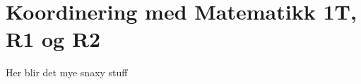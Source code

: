 \section*{Koordinering med Matematikk 1T, R1 og R2} \label{Sec: KoordR1R2}

	Her blir det mye snaxy stuff
